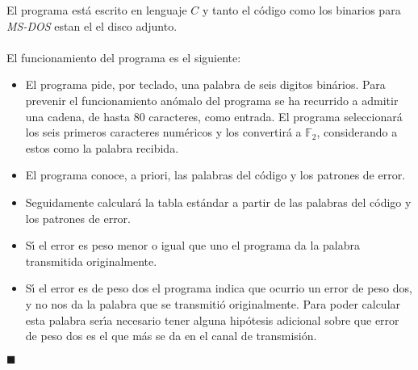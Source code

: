 El programa est\'a escrito en lenguaje $C$ y tanto el c\'odigo como los
binarios para \emph{MS-DOS} estan el el disco adjunto.\\ \\
%
El funcionamiento del programa es el siguiente:
\begin{itemize}
\item El programa pide, por teclado, una palabra de seis digitos bin\'arios. 
Para prevenir el funcionamiento an\'omalo del programa se ha recurrido a 
admitir una cadena, de hasta $80$ caracteres, como entrada. El programa
seleccionar\'a los seis primeros caracteres num\'ericos y los convertir\'a a
$\mathbb{F}_2$, considerando a estos como la palabra recibida.
\item El programa conoce, a priori, las palabras del c\'odigo y los patrones
de error.
\item Seguidamente calcular\'a la tabla est\'andar a partir de las palabras
del c\'odigo y los patrones de error.
\item S\'{\i} el error es peso menor o igual que uno el programa da la palabra
transmitida originalmente.
\item S\'{\i} el error es de peso dos el programa indica que ocurrio un error
de peso dos, y no nos da la palabra que se transmiti\'o originalmente. Para
poder calcular esta palabra ser\'{\i}a necesario tener alguna hip\'otesis
adicional sobre que error de peso dos es el que m\'as se da en el canal de
transmisi\'on.
\end{itemize}

\begin{flushright}
$\blacksquare$
\end{flushright}
